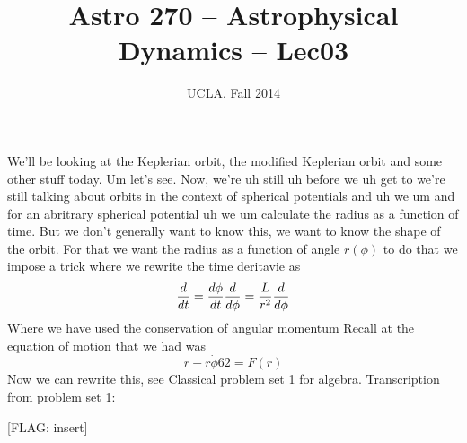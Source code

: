 


\title{Astro 270 -- Astrophysical Dynamics -- Lec03}
\author{UCLA, Fall 2014}
\date{}


\setlength{\unitlength}{1mm}
\maketitle


We'll be looking at the Keplerian orbit, the modified Keplerian orbit and some other stuff today. Um let's see. Now, we're uh still uh before we uh get to we're still talking about orbits in the context of spherical potentials and uh we um and for an abritrary spherical potential uh we um calculate the radius as a function of time. But we don't generally want to know this, we want to know the shape of the orbit. For that we want the radius as a function of angle $r(\phi)$ to do that we impose a trick where we rewrite the time deritavie as 
\begin{equation}
\frac{d }{d t} = \frac{d \phi}{d t} \frac{d }{d \phi} = \frac{L}{r^2} \frac{d }{d \phi}
\end{equation}
Where we have used the conservation of angular momentum
Recall at the equation of motion that we had was
\begin{equation}
\ddot{r} - r\dot{\phi}62 = F(r)
\end{equation}
Now we can rewrite this, see Classical problem set 1 for algebra. Transcription from problem set 1:

[FLAG: insert]


